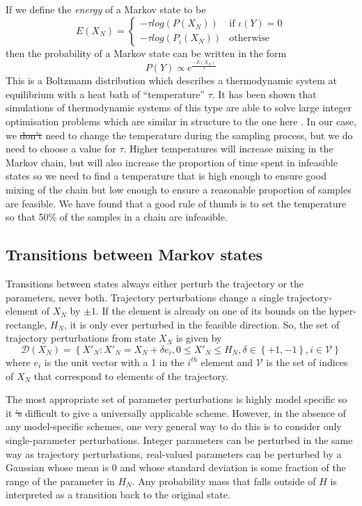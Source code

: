 \documentclass{article}
\providecommand{\DIFaddtex}[1]{{\protect\color{blue}\uwave{#1}}} %
\providecommand{\DIFdeltex}[1]{{\protect\color{red}\sout{#1}}}                      %
\providecommand{\DIFaddbegin}{} %
\providecommand{\DIFaddend}{} %
\providecommand{\DIFdelbegin}{} %
\providecommand{\DIFdelend}{} %
\providecommand{\DIFadd}[1]{\texorpdfstring{\DIFaddtex{#1}}{#1}} %
\providecommand{\DIFdel}[1]{\texorpdfstring{\DIFdeltex{#1}}{}} %
\newcommand{\DIFscaledelfig}{0.5}
\newlength{\DIFdelgraphicswidth} %
\newlength{\DIFdelgraphicsheight} %
\newcommand{\DIFaddincludegraphics}[2][]{{\color{blue}\fbox{\DIFOincludegraphics[#1]{#2}}}} %
\newcommand{\DIFdelincludegraphics}[2][]{%
\sbox{\DIFdelgraphicsbox}{\DIFOincludegraphics[#1]{#2}}%
\settoboxwidth{\DIFdelgraphicswidth}{\DIFdelgraphicsbox} %
\settoboxtotalheight{\DIFdelgraphicsheight}{\DIFdelgraphicsbox} %
\scalebox{\DIFscaledelfig}{%
\parbox[b]{\DIFdelgraphicswidth}{\usebox{\DIFdelgraphicsbox}\\[-\baselineskip] \rule{\DIFdelgraphicswidth}{0em}}\llap{\resizebox{\DIFdelgraphicswidth}{\DIFdelgraphicsheight}{%
\setlength{\unitlength}{\DIFdelgraphicswidth}%
\begin{picture}(1,1)%
\thicklines\linethickness{2pt} %
{\color[rgb]{1,0,0}\put(0,0){\framebox(1,1){}}}%
{\color[rgb]{1,0,0}\put(0,0){\line( 1,1){1}}}%
{\color[rgb]{1,0,0}\put(0,1){\line(1,-1){1}}}%
\end{picture}%
}\hspace*{3pt}}} %
} %
\DeclareRobustCommand{\DIFaddbegin}{\DIFOaddbegin \let\includegraphics\DIFaddincludegraphics} %
\DeclareRobustCommand{\DIFaddend}{\DIFOaddend \let\includegraphics\DIFOincludegraphics} %
\DeclareRobustCommand{\DIFdelbegin}{\DIFOdelbegin \let\includegraphics\DIFdelincludegraphics} %
\DeclareRobustCommand{\DIFdelend}{\DIFOaddend \let\includegraphics\DIFOincludegraphics} %
\begin{document}
If we define the \textit{energy} of a Markov state to be
\[
E(X_N) =
\begin{cases}
-\tau log(P(X_N)) & \text{if }  \iota(Y) = 0\\
-\tau log(P_\iota(X_N)) & \text{otherwise}
\end{cases}
\]
then the probability of a Markov state can be written in the form
\begin{equation}
P(Y) \propto e^{\frac{-E(X_N)}{\tau}}
\end{equation}
This is a Boltzmann distribution which describes a thermodynamic system at equilibrium with a heat bath of ``temperature'' $\tau$. It has been shown that simulations of thermodynamic systems of this type are able to solve large integer optimisation problems which are similar in structure to the one here \citep{kirkpatrick1983optimization}. In our case, we \DIFdelbegin \DIFdel{don't }\DIFdelend \DIFaddbegin \DIFadd{do not }\DIFaddend need to change the temperature during the sampling process, but we do need to choose a value for $\tau$. Higher temperatures will increase mixing in the Markov chain, but will also increase the proportion of time spent in infeasible states so we need to find a temperature that is high enough to ensure good mixing of the chain but low enough to ensure a reasonable proportion of samples are feasible. We have found that a good rule of thumb is to set the temperature so that 50\% of the samples in a chain are infeasible.

\subsection{Transitions between Markov states}

Transitions between states always either perturb the trajectory or the parameters, never both. Trajectory perturbations change a single trajectory-element of $X_N$ by $\pm 1$. If the element is already on one of its bounds on the hyper-rectangle, $H_N$, it is only ever perturbed in the feasible direction. So, the set of trajectory perturbations from state $X_N$ is given by
\[
\mathcal{D}(X_N) = \left\{X'_N : X'_N = X_N + \delta e_i, 0 \le X'_N \le H_N, \delta \in \left\{+1,-1\right\}, i \in \mathcal{V} \right\}
\]
where $e_i$ is the unit vector with a 1 in the $i^{th}$ element and $\mathcal{V}$ is the set of indices of $X_N$ that correspond to elements of the trajectory.

The most appropriate set of parameter perturbations is highly model specific so it \DIFdelbegin \DIFdel{'s }\DIFdelend \DIFaddbegin \DIFadd{is }\DIFaddend difficult to give a universally applicable scheme. However, in the absence of any model-specific schemes, one very general way to do this is to consider only single-parameter perturbations. Integer parameters can be perturbed in the same way as trajectory perturbations, real-valued parameters can be perturbed by a Gaussian whose mean is 0 and whose standard deviation is some fraction of the range of the parameter in $H_N$. Any probability mass that falls outside of $H$ is interpreted as a transition back to the original state.
\end{document}
